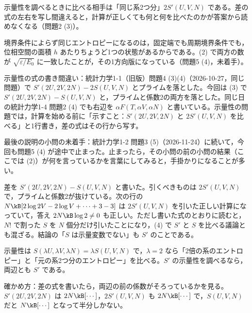 \begin{daiji}
  \item 示量性を調べるときに比べる相手は「同じ系2つ分」$2S'(U,V,N)$ である。差の式の左右を写し間違えると，計算が正しくても何と何を比べたのかが答案から読めなくなる（問題2 (3)）。
  \item 境界条件によらず同じエントロピーになるのは，固定端でも周期境界条件でも，位相空間の面積 $h$ あたりちょうど1つの状態があるからである。(2) で両方の数が $\sqrt{\varepsilon/E_{0}}$ に一致したことが，その1方向版になっている（問題5 (4)，未着手）。
\end{daiji}
\begin{maemo}
  \item 示量性の式の書き間違い：統計力学1-1（旧版）問題4 (3)(4)（2026-10-27，同じ問題）で $S'(2U,2V,2N)-2S(U,V,N)$ とプライムを落とした。今回は (3) で $S'(2U,2V,2N)-S(U,V,N)$ と，プライムと係数2の両方を落とした。同じ日の統計力学1-4 問題2 (4) でも右辺を $\alpha F(T,\alpha V,\alpha N)$ と書いている。示量性の問題では，計算を始める前に「示すこと：$S'(2U,2V,2N)$ と $2S'(U,V,N)$ を比べる」と1行書き，差の式はその行から写す。
  \item 最後の説明の小問の未着手：統計力学1-2 問題3 (5)（2026-11-24）に続いて，今回も問題5 (4) が途中で止まった。止まったら，その小問の前の小問の結果（ここでは (2)）が何を言っているかを言葉にしてみると，手掛かりになることが多い。
\end{maemo}
\begin{kotaeran}
   差を $S'(2U,2V,2N)-S(U,V,N)$ と書いた。引くべきものは $2S'(U,V,N)$ で，プライムと係数2が抜けている。次の行の $N\kB[2\log2V-2\log V+\cdots+3-3]$ は $2S'(U,V,N)$ を引いた正しい計算になっていて，答え $2N\kB\log2\neq0$ も正しい。ただし書いた式のとおりに読むと，$N!$ で割った $S$ を $N$ 個分だけ引いたことになり，(4) で $S'$ と $S$ を比べる議論とも混ざる。結論の「$S$ は示量変数でない」も $S'$ のことである。
\end{kotaeran}
\begin{rikai}
  \item 示量性は $S(\lambda U,\lambda V,\lambda N)=\lambda S(U,V,N)$ で，$\lambda=2$ なら「2倍の系のエントロピー」と「元の系2つ分のエントロピー」を比べる。$S'$ の示量性を調べるなら，両辺とも $S'$ である。
  \item 確かめ方：差の式を書いたら，両辺の前の係数がそろっているかを見る。$S'(2U,2V,2N)$ は $2N\kB[\cdots]$，$2S'(U,V,N)$ も $2N\kB[\cdots]$ で，$S(U,V,N)$ だと $N\kB[\cdots]$ となって半分しかない。
\end{rikai}
